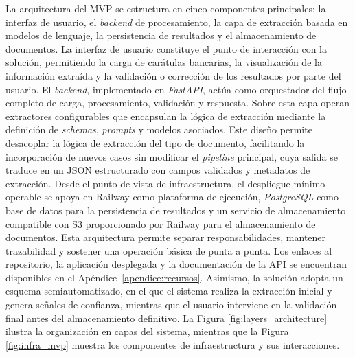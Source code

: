 La arquitectura del MVP se estructura en cinco componentes principales: la interfaz de usuario, el \textit{backend} de procesamiento, la capa de extracción basada en modelos de lenguaje, la persistencia de resultados y el almacenamiento de documentos. La interfaz de usuario constituye el punto de interacción con la solución, permitiendo la carga de carátulas bancarias, la visualización de la información extraída y la validación o corrección de los resultados por parte del usuario. El \textit{backend}, implementado en \textit{FastAPI}, actúa como orquestador del flujo completo de carga, procesamiento, validación y respuesta. Sobre esta capa operan extractores configurables que encapsulan la lógica de extracción mediante la definición de \textit{schemas}, \textit{prompts} y modelos asociados. Este diseño permite desacoplar la lógica de extracción del tipo de documento, facilitando la incorporación de nuevos casos sin modificar el \textit{pipeline} principal, cuya salida se traduce en un JSON estructurado con campos validados y metadatos de extracción. Desde el punto de vista de infraestructura, el despliegue mínimo operable se apoya en Railway como plataforma de ejecución, \textit{PostgreSQL} como base de datos para la persistencia de resultados y un servicio de almacenamiento compatible con S3 proporcionado por Railway para el almacenamiento de documentos. Esta arquitectura permite separar responsabilidades, mantener trazabilidad y sostener una operación básica de punta a punta. Los enlaces al repositorio, la aplicación desplegada y la documentación de la API se encuentran disponibles en el Apéndice~\ref{apendice:recursos}. Asimismo, la solución adopta un esquema semiautomatizado, en el que el sistema realiza la extracción inicial y genera señales de confianza, mientras que el usuario interviene en la validación final antes del almacenamiento definitivo. La Figura \ref{fig:layers_architecture} ilustra la organización en capas del sistema, mientras que la Figura \ref{fig:infra_mvp} muestra los componentes de infraestructura y sus interacciones.





